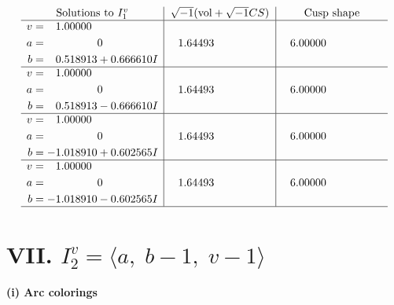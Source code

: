\documentclass[1p]{elsarticle_modified}
\theoremstyle{definition}
\newcommand{\I}{\sqrt{-1}}
\begin{document}
$$\begin{array}{c|c|c}  
\text{Solutions to }I^v_{1}& \I (\text{vol} + \sqrt{-1}CS) & \text{Cusp shape}\\
 \hline 
\begin{aligned}
v &= \phantom{-}1.00000\phantom{ +0.000000I} \\
a &= \phantom{-0.000000 } 0 \\
b &= \phantom{-}0.518913 + 0.666610 I\end{aligned}
 & \phantom{-}1.64493\phantom{ +0.000000I} & \phantom{-}6.00000\phantom{ +0.000000I} \\ \hline\begin{aligned}
v &= \phantom{-}1.00000\phantom{ +0.000000I} \\
a &= \phantom{-0.000000 } 0 \\
b &= \phantom{-}0.518913 - 0.666610 I\end{aligned}
 & \phantom{-}1.64493\phantom{ +0.000000I} & \phantom{-}6.00000\phantom{ +0.000000I} \\ \hline\begin{aligned}
v &= \phantom{-}1.00000\phantom{ +0.000000I} \\
a &= \phantom{-0.000000 } 0 \\
b &= -1.018910 + 0.602565 I\end{aligned}
 & \phantom{-}1.64493\phantom{ +0.000000I} & \phantom{-}6.00000\phantom{ +0.000000I} \\ \hline\begin{aligned}
v &= \phantom{-}1.00000\phantom{ +0.000000I} \\
a &= \phantom{-0.000000 } 0 \\
b &= -1.018910 - 0.602565 I\end{aligned}
 & \phantom{-}1.64493\phantom{ +0.000000I} & \phantom{-}6.00000\phantom{ +0.000000I}\\
 \hline 
 \end{array}$$\newpage\newpage\renewcommand{\arraystretch}{1}
\centering \section*{VII. $I^v_{2}= \langle a,\;b-1,\;v-1 \rangle$}
\flushleft \textbf{(i) Arc colorings}\\
\end{document}
